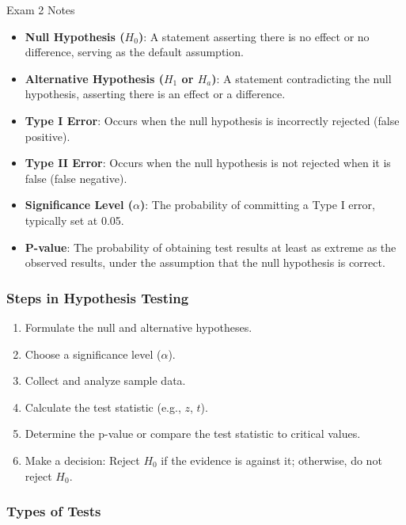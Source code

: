 \begin{examnotes}{Exam 2 Notes}
    \begin{itemize}
        \item \textbf{Null Hypothesis ($H_0$)}: A statement asserting there is no effect or no difference, serving as the default assumption.
        \item \textbf{Alternative Hypothesis ($H_1$ or $H_a$)}: A statement contradicting the null hypothesis, asserting there is an effect or a difference.
        \item \textbf{Type I Error}: Occurs when the null hypothesis is incorrectly rejected (false positive).
        \item \textbf{Type II Error}: Occurs when the null hypothesis is not rejected when it is false (false negative).
        \item \textbf{Significance Level ($\alpha$)}: The probability of committing a Type I error, typically set at 0.05.
        \item \textbf{P-value}: The probability of obtaining test results at least as extreme as the observed results, under the assumption that the null hypothesis is correct.
    \end{itemize}
    
    \subsubsection*{Steps in Hypothesis Testing}
    
    \begin{enumerate}
        \item Formulate the null and alternative hypotheses.
        \item Choose a significance level ($\alpha$).
        \item Collect and analyze sample data.
        \item Calculate the test statistic (e.g., $z$, $t$).
        \item Determine the p-value or compare the test statistic to critical values.
        \item Make a decision: Reject $H_0$ if the evidence is against it; otherwise, do not reject $H_0$.
    \end{enumerate}
    
    \subsubsection*{Types of Tests}
    

\end{examnotes}
